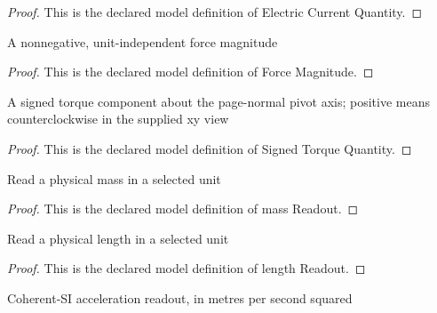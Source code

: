 \begin{proof}
  This is the declared model definition of Electric Current Quantity.
\end{proof}
\begin{definition}
  \label{def:physics:phyx-mini-0951:phyxminiproblems-problemphyxmini0951-forcemagnitude}
  A nonnegative, unit-independent force magnitude
\end{definition}
\begin{proof}
  This is the declared model definition of Force Magnitude.
\end{proof}
\begin{definition}
  \label{def:physics:phyx-mini-0951:phyxminiproblems-problemphyxmini0951-signedtorquequantity}
  A signed torque component about the page-normal pivot axis; positive means counterclockwise in the supplied xy view
\end{definition}
\begin{proof}
  This is the declared model definition of Signed Torque Quantity.
\end{proof}
\begin{definition}
  \label{def:physics:phyx-mini-0951:phyxminiproblems-problemphyxmini0951-massreadout}
  Read a physical mass in a selected unit
\end{definition}
\begin{proof}
  This is the declared model definition of mass Readout.
\end{proof}
\begin{definition}
  \label{def:physics:phyx-mini-0951:phyxminiproblems-problemphyxmini0951-lengthreadout}
  Read a physical length in a selected unit
\end{definition}
\begin{proof}
  This is the declared model definition of length Readout.
\end{proof}
\begin{definition}
  \label{def:physics:phyx-mini-0951:phyxminiproblems-problemphyxmini0951-accelerationinmeterspersecondsquared}
  Coherent-SI acceleration readout, in metres per second squared
\end{definition}
